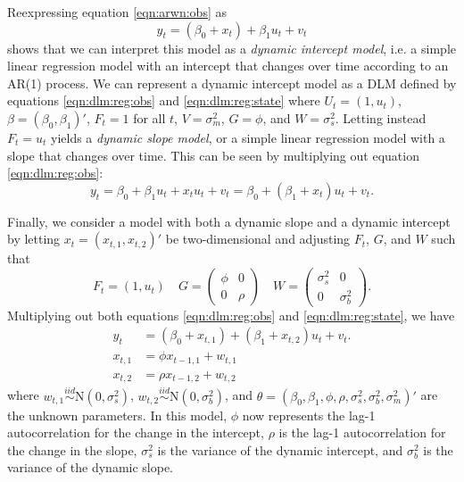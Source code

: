 Reexpressing equation \eqref{eqn:arwn:obs} as
\begin{equation}
y_t = (\beta_0 + x_t) + \beta_1u_t + v_t \label{eqn:arwn:dynint}
\end{equation}
shows that we can interpret this model as a \emph{dynamic intercept model}, i.e. a simple linear regression model with an intercept that changes over time according to an AR(1) process. We can represent a dynamic intercept model as a DLM defined by equations \eqref{eqn:dlm:reg:obs} and \eqref{eqn:dlm:reg:state} where $U_t = (1, u_t)$, $\beta = (\beta_0, \beta_1)'$, $F_t = 1$ for all $t$, $V = \sigma^2_m$, $G = \phi$, and $W = \sigma^2_s$. Letting instead $F_t = u_t$ yields a \emph{dynamic slope model}, or a simple linear regression model with a slope that changes over time. This can be seen by multiplying out equation \eqref{eqn:dlm:reg:obs}:
\begin{equation}
y_t = \beta_0 + \beta_1u_t + x_tu_t + v_t = \beta_0 + (\beta_1 + x_t)u_t + v_t. \label{eqn:arwn:dynslo}
\end{equation}

Finally, we consider a model with both a dynamic slope and a dynamic intercept by letting $x_t = (x_{t,1},x_{t,2})'$ be two-dimensional and adjusting $F_t$, $G$, and $W$ such that
\begin{equation}
F_t = (1, u_t) \quad G = \left(\begin{array}{cc} \phi & 0 \\ 0 & \rho \end{array}\right) \quad W = \left(\begin{array}{cc} \sigma^2_s & 0 \\ 0 & \sigma^2_b \end{array}\right). \label{eqn:arwn:dynboth:def}
\end{equation}
Multiplying out both equations \eqref{eqn:dlm:reg:obs} and \eqref{eqn:dlm:reg:state}, we have
\begin{align}
y_t &= (\beta_0 + x_{t,1}) + (\beta_1 + x_{t,2})u_t + v_t. \label{eqn:arwn:dynboth:obs} \\
x_{t,1} &= \phi x_{t-1,1} + w_{t,1} \label{eqn:arwn:dynboth:state1} \\
x_{t,2} &= \rho x_{t-1,2} + w_{t,2} \label{eqn:arwn:dynboth:state2}
\end{align}
where $w_{t,1} \stackrel{iid}{\sim} \mbox{N}(0,\sigma^2_s)$, $w_{t,2} \stackrel{iid}{\sim} \mbox{N}(0,\sigma^2_b)$, and $\theta = (\beta_0,\beta_1,\phi,\rho,\sigma^2_s,\sigma^2_b,\sigma^2_m)'$ are the unknown parameters. In this model, $\phi$ now represents the lag-1 autocorrelation for the change in the intercept, $\rho$ is the lag-1 autocorrelation for the change in the slope, $\sigma^2_s$ is the variance of the dynamic intercept, and $\sigma^2_b$ is the variance of the dynamic slope.

